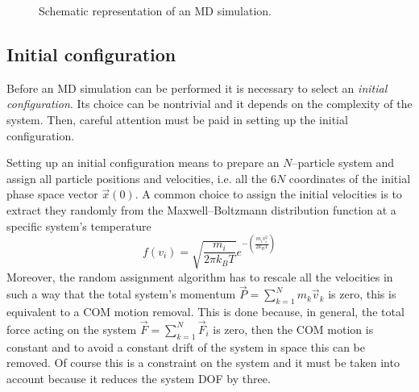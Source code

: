 \begin{figure}[!ht]
\centering
{}
\caption{Schematic representation of an \acs{MD} simulation.}
\label{fig:MDscheme}
\end{figure}

\subsection{Initial configuration}
Before an \ac{MD} simulation can be performed it is necessary to select an \textit{initial configuration}. Its 
choice can be nontrivial and it depends on the complexity of the system. Then, careful attention must be paid in 
setting up the initial configuration.

Setting up an initial configuration means to prepare an $N$--particle system and assign all particle positions 
and velocities, i.e. all the $6N$ coordinates of the initial phase space vector $\vec x(0)$. A common choice to 
assign the initial velocities is to extract they randomly from the Maxwell--Boltzmann distribution function at a 
specific system's temperature
\begin{equation*}
	f(v_i) = \sqrt{\frac{m_i}{2\pi k_B T}}e^{-\left ( \frac{m_iv_i^2}{2k_B T}\right )}
\end{equation*}
Moreover, the random assignment algorithm has to rescale all the velocities in such a way that the total system's 
momentum $\vec P = \sum_{k=1}^N m_k\vec v_k$ is zero, this is equivalent to a \ac{COM} motion removal. This is 
done because, in general, the total force acting on the system $\vec F = \sum_{k=1}^N \vec F_i$ is zero, then the 
\ac{COM} motion is constant and to avoid a constant drift of the system in space this can be removed. Of course 
this is a constraint on the system and it must be taken into account because it reduces the system \ac{DOF} by 
three.

